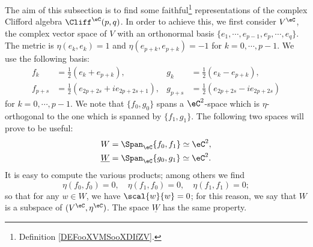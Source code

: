 The aim of this subsection is to find some faithful\footnote{Definition \ref{DEFooXVMSooXDIfZV}.} representations of the complex Clifford algebra $\Cliff^{\eC}(p,q)$. In order to achieve this, we first consider $V^{\eC}$, the complex vector space of $V$ with an orthonormal basis $\{ e_1,\cdots,e_{p-1},e_p,\cdots,e_q  \}$. The metric is $\eta(e_k,e_k)=1$ and $\eta(e_{p+k},e_{p+k})=-1$ for $k=0,\cdots,p-1$. We use the following basis:
\begin{align}
	f_k     & =\frac{1}{2}(e_k+e_{p+k}),            & g_k     & =\frac{1}{2}(e_k-e_{p+k}),         \\
	f_{p+s} & =\frac{1}{2}(e_{2p+2s}+ie_{2p+2s+1}), & g_{p+s} & =\frac{1}{2}(e_{2p+2s}-ie_{2p+2s})
\end{align}
for $k=0,\cdots,p-1$.
We note that $\{f_0,g_0\}$ spans a $\eC^2$-space which is $\eta$-orthogonal to the one which is spanned by $\{f_1,g_1\}$. The following two  spaces will prove to be useful:
\begin{subequations}
	\begin{align}
		W             & =\Span_{\eC}\{f_0,f_1\}\simeq\eC^2, \\
		\underline{W} & =\Span_{\eC}\{g_0,g_1\}\simeq\eC^2.
	\end{align}
\end{subequations}
It is easy to compute the various products; among others we find
\begin{equation}
	\eta(f_0,f_0)=0,\quad
	\eta(f_1,f_0)=0,\quad
	\eta(f_1,f_1)=0;
\end{equation}
so that for any $w\in W$, we have $\scal{w}{w}=0$; for this reason, we say that $W$ is a  subspace of $(V^{\eC},\eta^{\eC})$. The space $\underline{W}$ has the same property.

